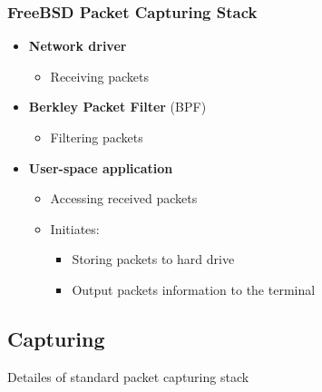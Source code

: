 \documentclass{beamer}
\begin{document}
\begin{frame}
\frametitle{FreeBSD Packet Capturing Stack}
\begin{itemize}
	\item \textbf{Network driver}
		\begin{itemize}
			\item Receiving packets\newline
		\end{itemize}
	\item \textbf{Berkley Packet Filter} (BPF)
		\begin{itemize}
			\item Filtering packets\newline
		\end{itemize}
	\item \textbf{User-space application}
		\begin{itemize}
			\item Accessing received packets
			\item Initiates:
				\begin{itemize}
					\item Storing packets to hard drive
					\item Output packets information to the terminal
				\end{itemize}
		\end{itemize}
\end{itemize}
\end{frame}

\subsection*{Capturing}
\begin{frame}
	\begin{center}
	\huge{Detailes of standard packet capturing stack}
	\end{center}
\end{frame}
\end{document}
